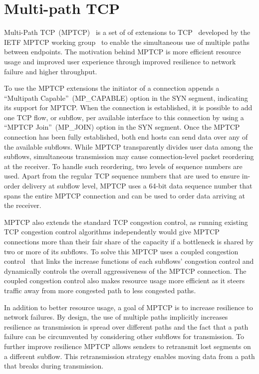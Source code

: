 \section{Multi-path TCP}
\label{sec:transports}
Multi-Path TCP~(MPTCP)~\cite{RFC6824} is a set of of extensions to
TCP~\cite{RFC793,RFC5681} developed by the IETF MPTCP working
group~\cite{MPTCPWG} to enable the simultaneous use of multiple paths between
endpoints. The motivation behind MPTCP is more efficient resource usage and
improved user experience through improved resilience to network failure and
higher throughput.

To use the MPTCP extensions the initiator of a connection appends a
``Multipath Capable''~(MP\_CAPABLE) option in the SYN segment, indicating its support for
MPTCP. When the connection is established, it is possible to add one
TCP flow, or subflow, per available interface to this connection by using a ``MPTCP Join''~(MP\_JOIN)
option in the SYN segment. Once the MPTCP connection has been fully established, both end hosts can
send data over any of the available subflows. While MPTCP transparently
divides user data among the subflows, simultaneous transmission may cause
connection-level packet reordering at the receiver. To handle such reordering,
two levels of sequence numbers are used. Apart from the regular TCP sequence
numbers that are used to ensure in-order delivery at subflow level, MPTCP uses a
64-bit data sequence number that spans the entire MPTCP connection and can be
used to order data arriving at the receiver.

MPTCP also extends the standard TCP congestion control, as running existing TCP
congestion control algorithms independently would give MPTCP connections more
than their fair share of the capacity if a bottleneck is shared by two or more of its
subflows. To solve this MPTCP uses a coupled congestion control~\cite{rfc6356}
that links the increase functions of each subflows' congestion control and
dynamically controls the overall aggressiveness of the MPTCP connection. The
coupled congestion control also makes resource usage more efficient as it steers
traffic away from more congested path to less congested paths.

In addition to better resource usage, a goal of MPTCP is to increase
resilience to network failures. By design, the use of multiple paths implicitly
increases resilience as transmission is spread over different paths and the fact
that a path failure can be circumvented by considering other subflows for
transmission. To further improve resilience MPTCP allows senders to retransmit
lost segments on a different subflow. This retransmission strategy enables
moving data from a path that breaks during transmission.


